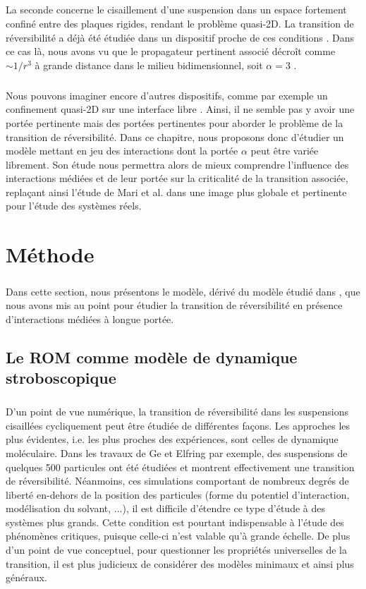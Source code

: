\subparagraph{}La seconde concerne le cisaillement d'une suspension dans un espace fortement confiné entre des plaques rigides, rendant le problème quasi-2D. La transition de réversibilité a déjà été étudiée dans un dispositif proche de ces conditions \cite{guasto_hydrodynamic_2010}. Dans ce cas là, nous avons vu que le propagateur pertinent associé décroît comme $\sim 1/r^3$ à grande distance dans le milieu bidimensionnel, soit $\alpha = 3$ \cite{diamant_hydrodynamic_2009}.

\subparagraph{}Nous pouvons imaginer encore d'autres dispositifs, comme par exemple un confinement quasi-2D sur une interface libre \cite{farhadi_shear_induced_2017}. Ainsi, il ne semble pas y avoir une portée pertinente mais des portées pertinentes pour aborder le problème de la transition de réversibilité. Dans ce chapitre, nous proposons donc d'étudier un modèle mettant en jeu des interactions dont la portée $\alpha$ peut être variée librement. Son étude nous permettra alors de mieux comprendre l'influence des interactions médiées et de leur portée sur la criticalité de la transition associée, replaçant ainsi l'étude de Mari et al. \cite{mari_absorbing_2022} dans une image plus globale et pertinente pour l'étude des systèmes réels.

\section{Méthode}

\subparagraph{}Dans cette section, nous présentons le modèle, dérivé du modèle étudié dans \cite{mari_absorbing_2022}, que nous avons mis au point pour étudier la transition de réversibilité en présence d'interactions médiées à longue portée.

\subsection{Le ROM comme modèle de dynamique stroboscopique}

\subparagraph{}D'un point de vue numérique, la transition de réversibilité dans les suspensions cisaillées cycliquement peut être étudiée de différentes façons. Les approches les plus évidentes, i.e. les plus proches des expériences, sont celles de dynamique moléculaire. Dans les travaux de Ge et Elfring \cite{ge_rheology_2022} par exemple, des suspensions de quelques 500 particules ont été étudiées et montrent effectivement une transition de réversibilité. Néanmoins, ces simulations comportant de nombreux degrés de liberté en-dehors de la position des particules (forme du potentiel d'interaction, modélisation du solvant, ...), il est difficile d'étendre ce type d'étude à des systèmes plus grands. Cette condition est pourtant indispensable à l'étude des phénomènes critiques, puisque celle-ci n'est valable qu'à grande échelle. De plus d'un point de vue conceptuel, pour questionner les propriétés universelles de la transition, il est plus judicieux de considérer des modèles minimaux et ainsi plus généraux.


